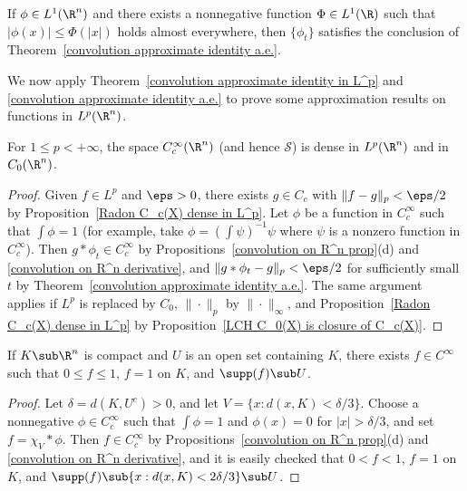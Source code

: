 \begin{corollary}
If $\phi\in L^1(\R^n)$ and there exists a nonnegative function $\Phi\in L^1(\R)$ such that $|\phi(x)|\leq\Phi(|x|)$ holds almost everywhere, then $\{\phi_t\}$ satisfies the conclusion of Theorem~\ref{convolution approximate identity a.e.}.
\end{corollary}
We now apply Theorem~\ref{convolution approximate identity in L^p} and \ref{convolution approximate identity a.e.} to prove some approximation results on functions in $L^p(\R^n)$.
\begin{proposition}\label{smooth compact function dense in L^p}
For $1\leq p<+\infty$, the space $C^\infty_c(\R^n)$ (and hence $\mathscr{S}$) is dense in $L^p(\R^n)$ and in $C_0(\R^n)$.
\end{proposition}
\begin{proof}
Given $f\in L^p$ and $\eps>0$, there exists $g\in C_c$ with $\|f-g\|_p<\eps/2$ by Proposition~\ref{Radon C_c(X) dense in L^p}. Let $\phi$ be a function in $C_c^\infty$ such that $\int\phi=1$ (for example, take $\phi=(\int\psi)^{-1}\psi$ where $\psi$ is a nonzero function in $C^\infty_c$). Then $g\ast\phi_t\in C_c^\infty$ by Propositions~\ref{convolution on R^n prop}(d) and \ref{convolution on R^n derivative}, and $\|g\ast\phi_t-g\|_p<\eps/2$ for sufficiently small $t$ by Theorem~\ref{convolution approximate identity a.e.}. The same argument applies if $L^p$ is replaced by $C_0$, $\|\cdot\|_p$ by $\|\cdot\|_\infty$, and Proposition~\ref{Radon C_c(X) dense in L^p} by Proposition~\ref{LCH C_0(X) is closure of C_c(X)}.
\end{proof}
\begin{proposition}\label{Urysohn Lemma C^infty}
If $K\sub\R^n$ is compact and $U$ is an open set containing $K$, there exists $f\in C^\infty$ such that $0\leq f\leq 1$, $f=1$ on $K$, and $\supp(f)\sub U$.
\end{proposition}
\begin{proof}
Let $\delta=d(K,U^c)>0$, and let $V=\{x:d(x,K)<\delta/3\}$. Choose a nonnegative $\phi\in C_c^\infty$ such that $\int\phi=1$ and $\phi(x)=0$ for $|x|>\delta/3$, and set $f=\chi_V\ast\phi$. Then $f\in C_c^\infty$ by Propositions~\ref{convolution on R^n prop}(d) and \ref{convolution on R^n derivative}, and it is easily checked that $0<f<1$, $f=1$ on $K$, and $\supp(f)\sub\{x:d(x,K)<2\delta/3\}\sub U$.
\end{proof}
